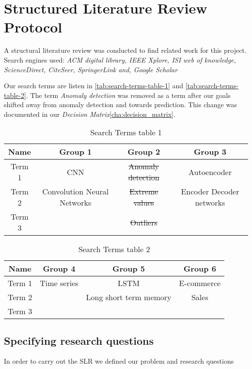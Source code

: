 
\section{Structured Literature Review Protocol}

A structural literature review was conducted to find related work for this project.
Search engines used:
\textit{
ACM digital library,
IEEE Xplore,
ISI web of knowledge,
ScienceDirect,
CiteSeer,
SpringerLink and,
Google Scholar
}

Our search terms are listen in \autoref{tab:search-terms-table-1} and \autoref{tab:search-terms-table-2}.
The term \textit{Anomaly detection} was removed as a term after our goals shifted away from anomaly detection and towards prediction.
This change was documented in our \textit{Decision Matrix}\autoref{cha:decision_matrix}.

\begin{table}[htbp]
    \begin{center}
        \begin{tabular}{|c|c|c|c|}\hline\hline
Name&Group 1&Group 2&Group 3\\ \hline
Term 1&CNN&\sout{Anomaly detection}&Autoencoder\\ \hline
Term 2&Convolution Neural Networks&\sout{Extreme values}&Encoder Decoder networks\\ \hline
Term 3&&\sout{Outliers}&  \\ \hline
        \end{tabular}
        \caption{Search Terms table 1}
        \label{tab:search-terms-table-1}
    \end{center}
\end{table}%

\begin{table}[htbp]
    \begin{center}
        \begin{tabular}{|c|c|c|c|}\hline\hline
Name &Group 4&Group 5&Group 6 \\ \hline
Term 1&Time series&LSTM&E-commerce \\ \hline
Term 2 &&Long short term memory&Sales \\ \hline
Term 3& &&\\ \hline 
        \end{tabular}
        \caption{Search Terms table 2}
    \label{tab:search-terms-table-2}
    \end{center}
\end{table}%

\subsection{Specifying research questions}
In order to carry out the SLR we defined our problem and research questions 